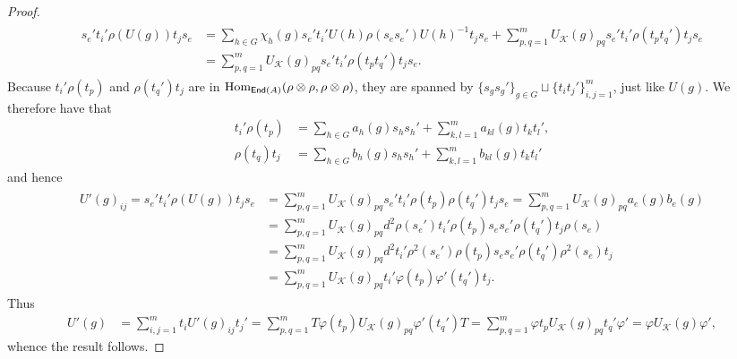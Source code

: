 \begin{proof}
\begin{align*}
\begin{split}
s_e't_i'\rho(U(g))t_js_e &= \sum_{h \in G}{\chi_h(g)s_e't_i'U(h)\rho(s_es_e')U(h)^{-1}t_js_e} + \sum_{p,q=1}^m{U_\mathcal{K}(g)_{pq}s_e't_i'\rho(t_pt_q')t_js_e}\\
&= \sum_{p,q=1}^m{U_\mathcal{K}(g)_{pq}s_e't_i'\rho(t_pt_q')t_js_e}.
\end{split}
\end{align*}
\noindent Because $t_i'\rho(t_p)$ and $\rho(t_q')t_j$ are in $\textup{Hom}_{\textup{\textsf{End}}(A)}({\rho \otimes \rho}, {\rho \otimes \rho})$, they are spanned by $\{s_gs_g'\}_{g \in G} \sqcup \{t_it_j'\}_{i,j = 1}^m$, just like $U(g)$. We therefore have that
\begin{align*}
t_i'\rho(t_p) &= \sum_{h \in G} a_h(g) s_hs_h' + \sum_{k,l=1}^m a_{kl}(g) t_kt_l',\\
\rho(t_q)t_j &= \sum_{h \in G} b_h(g) s_hs_h' + \sum_{k,l=1}^m b_{kl}(g) t_kt_l'
\end{align*}
\noindent and hence
\begin{align*}
\begin{split}
U'(g)_{ij} = s_e't_i'\rho(U(g))t_js_e &= \sum_{p,q=1}^m{U_\mathcal{K}(g)_{pq}s_e't_i'\rho(t_p)\rho(t_q')t_js_e} = \sum_{p,q=1}^m{U_\mathcal{K}(g)_{pq}a_e(g)b_e(g)}\\
&= \sum_{p,q=1}^m{U_\mathcal{K}(g)_{pq}d^2 \rho(s_e')t_i'\rho(t_p)s_es_e'\rho(t_q')t_j\rho(s_e)}\\
&= \sum_{p,q=1}^m{U_\mathcal{K}(g)_{pq}d^2 t_i'\rho^2(s_e')\rho(t_p)s_es_e'\rho(t_q')\rho^2(s_e)t_j}\\
&= \sum_{p,q=1}^m{U_\mathcal{K}(g)_{pq}t_i'\varphi(t_p)\varphi'(t_q')t_j}.
\end{split}
\end{align*}
\noindent Thus
\begin{align*}
U'(g) &= \sum_{i,j=1}^m{t_iU'(g)_{ij}t_j'} = \sum_{p,q=1}^m{T \varphi(t_p)U_\mathcal{K}(g)_{pq}\varphi'(t_q') T} = \sum_{p,q=1}^m{\varphi t_pU_\mathcal{K}(g)_{pq}t_q'\varphi'} = \varphi U_\mathcal{K}(g) \varphi',
\end{align*}
\noindent whence the result follows. %
\end{proof}\\


